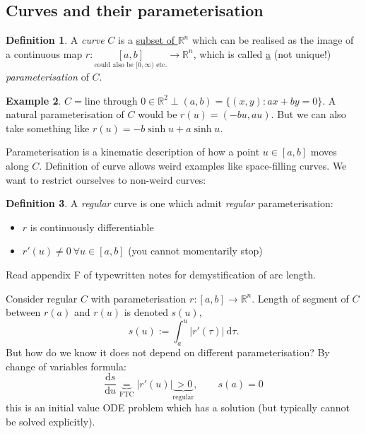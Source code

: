 \documentclass[a4paper]{article}
\theoremstyle{definition}
\newtheorem{defn}{Definition}[subsection]
\newtheorem{eg}[defn]{Example}
\begin{document}

\subsection{Curves and their parameterisation}
\begin{defn}
A \textit{curve} $C$ is a \underline{subset of $\mathbb R^n$} which can be realised as the image of a continuous map $r:\underset{\text{could also be }[0,\infty)\text{ etc.}}{[a,b]}\rightarrow \mathbb R^n$, which is called \underline{a} (not unique!) \textit{parameterisation} of $C$.
\end{defn}

\begin{eg}
$C=$line through $0\in \mathbb R^2 \perp (a,b) = \{(x,y):ax+by=0\}$. A natural parameterisation of $C$ would be $r(u)=(-bu,au)$. But we can also take something like $r(u) = -b \sinh u + a\sinh u$.
\end{eg}
Parameterisation is a kinematic description of how a point $u\in [a,b]$ moves along $C$. Definition of curve allows weird examples like space-filling curves. We want to restrict ourselves to non-weird curves:
\begin{defn}
A \textit{regular} curve is one which admit \textit{regular} parameterisation:
\begin{itemize}
    \item $r$ is continuously differentiable
    \item $r'(u)\neq 0 \ \forall u\in [a,b]$ \qquad (you cannot momentarily stop)
\end{itemize}
\end{defn}

Read appendix F of typewritten notes for demystification of arc length.

Consider regular $C$ with parameterisation $r:[a,b]\rightarrow \mathbb R^n$. Length of segment of $C$ between $r(a)$ and $r(u)$ is denoted $s(u)$,
\[
s(u) := \int_a^u |r'(\tau)| \ \mathrm d \tau .
\]
But how do we know it does not depend on different parameterisation? By change of variables formula:
\[
\frac{\mathrm d s}{\mathrm d u} \underbrace{=}_{\text{FTC}} |r'(u)|\underbrace{>0}_{\text{regular}},\qquad s(a)=0
\]
this is an initial value ODE problem which has a solution (but typically cannot be solved explicitly).
\end{document}
